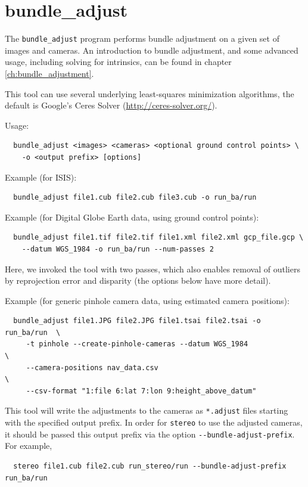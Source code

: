 \newpage
\section{bundle\_adjust}
\label{bundleadjust}

The \texttt{bundle\_adjust} program performs bundle adjustment on a
given set of images and cameras. An introduction to bundle adjustment,
and some advanced usage, including solving for intrinsics, 
can be found in chapter \ref{ch:bundle_adjustment}.

This tool can use several underlying least-squares minimization
algorithms, the default is Google's Ceres Solver
(\url{http://ceres-solver.org/}).

Usage:
\begin{verbatim}
  bundle_adjust <images> <cameras> <optional ground control points> \
    -o <output prefix> [options]
\end{verbatim}

Example (for ISIS):
\begin{verbatim}
  bundle_adjust file1.cub file2.cub file3.cub -o run_ba/run
\end{verbatim}

Example (for Digital Globe Earth data, using ground control points):
\begin{verbatim}
  bundle_adjust file1.tif file2.tif file1.xml file2.xml gcp_file.gcp \
    --datum WGS_1984 -o run_ba/run --num-passes 2
\end{verbatim}
Here, we invoked the tool with two passes, which also enables removal of outliers
by reprojection error and disparity (the options below have more detail).

Example (for generic pinhole camera data, using estimated camera positions):
\begin{verbatim}
  bundle_adjust file1.JPG file2.JPG file1.tsai file2.tsai -o run_ba/run  \
     -t pinhole --create-pinhole-cameras --datum WGS_1984                \
     --camera-positions nav_data.csv                                     \
     --csv-format "1:file 6:lat 7:lon 9:height_above_datum"
\end{verbatim}

This tool will write the adjustments to the cameras as \texttt{*.adjust}
files starting with the specified output prefix. In order for
\texttt{stereo} to use the adjusted cameras, it should be passed
this output prefix via the option \texttt{-\/-bundle-adjust-prefix}. For example,
\begin{verbatim}
  stereo file1.cub file2.cub run_stereo/run --bundle-adjust-prefix run_ba/run
\end{verbatim}

